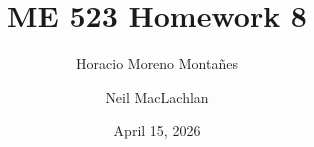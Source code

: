 

\title{ME 523 Homework 8}
\author{Horacio Moreno Monta\~nes \and Neil MacLachlan}
\date{April 15, 2026} %


\maketitle




\pagebreak




